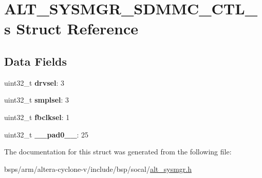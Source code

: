 \hypertarget{structALT__SYSMGR__SDMMC__CTL__s}{}\section{A\+L\+T\+\_\+\+S\+Y\+S\+M\+G\+R\+\_\+\+S\+D\+M\+M\+C\+\_\+\+C\+T\+L\+\_\+s Struct Reference}
\label{structALT__SYSMGR__SDMMC__CTL__s}
\subsection*{Data Fields}
\begin{DoxyCompactItemize}
\item 
\mbox{\label{structALT__SYSMGR__SDMMC__CTL__s_abd0adda06fb2e5c739aa3e00939944a7}} 
uint32\+\_\+t {\bfseries drvsel}\+: 3
\item 
\mbox{\label{structALT__SYSMGR__SDMMC__CTL__s_afc02d61b15da62e2e716306a609e665d}} 
uint32\+\_\+t {\bfseries smplsel}\+: 3
\item 
\mbox{\label{structALT__SYSMGR__SDMMC__CTL__s_a49e1b5361927384e198d9d2d69942dd5}} 
uint32\+\_\+t {\bfseries fbclksel}\+: 1
\item 
\mbox{\label{structALT__SYSMGR__SDMMC__CTL__s_acd68ecf8d589806ee1050fdc078431f1}} 
uint32\+\_\+t {\bfseries \+\_\+\+\_\+pad0\+\_\+\+\_\+}\+: 25
\end{DoxyCompactItemize}


The documentation for this struct was generated from the following file\+:\begin{DoxyCompactItemize}
\item 
bsps/arm/altera-\/cyclone-\/v/include/bsp/socal/\mbox{\hyperlink{alt__sysmgr_8h}{alt\+\_\+sysmgr.\+h}}\end{DoxyCompactItemize}
